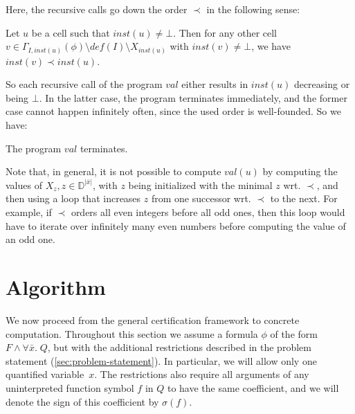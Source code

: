 \documentclass[runningheads]{llncs}
\newcommand{\numvar}[1]{|#1|}
\newcommand{\domain}{\mathbb{D}}
\newcommand{\coeffsign}[1]{\sigma(#1)}
\begin{document}
Here, the recursive calls go down the order $\prec$ in the following sense:
\begin{property}
  \label{prop:recmonot}
	Let $u$ be a cell such that $\mathit{inst}(u)\neq\bot$. Then for any other cell~$v\in\Gamma_{I,\mathit{inst}(u)}(\phi)\setminus \mathit{def}(I)\setminus X_{\mathit{inst}(u)}$ with $\mathit{inst}(v)\neq\bot$, we have $\mathit{inst}(v)\prec \mathit{inst}(u)$.
\end{property}

So each recursive call of the program $val$ either results in $\mathit{inst}(u)$ decreasing or being $\bot$. In the latter case, the program terminates immediately, and the former case cannot happen infinitely often, since the used order is well-founded. So we have:
\begin{property}
The program $val$ terminates.
\end{property}

Note that, in general, it is not possible to compute $val(u)$ by computing the values of $X_z, z \in \domain^{\numvar{\bar{x}}}$, with $z$ being initialized with the minimal $z$ wrt. $\prec$, and then using a loop that increases $z$ from one successor wrt. $\prec$ to the next. For example, if  $\prec$  orders all even integers before all odd ones, then this loop would have to iterate over infinitely many even numbers before computing the value of an odd one.
     




\section{Algorithm}\label{sec:alg}

We now proceed from the  general certification framework to concrete computation. Throughout this section we assume a formula $\phi$ of the form~$F \land \forall \bar{x}.\; Q$, but with the additional restrictions described in the problem statement (\cref{sec:problem-statement}). In particular, we will allow only one quantified variable~$x$. The restrictions also require all arguments of any uninterpreted function symbol $f$ in $Q$ to have the same coefficient, and we will denote the sign of this coefficient by $\coeffsign{f}$.
\end{document}
